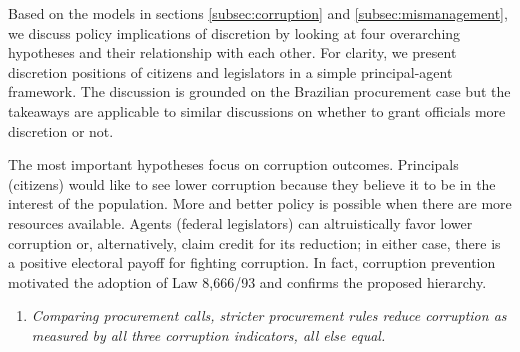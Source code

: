 \documentclass[11pt]{article}
\newcommand{\hypopen}{Comparing procurement calls}
\begin{document}

Based on the models in sections \ref{subsec:corruption} and \ref{subsec:mismanagement}, we discuss policy implications of discretion by looking at four overarching hypotheses and their relationship with each other. For clarity, we present discretion positions of citizens and legislators in a simple principal-agent framework. The discussion is grounded on the Brazilian procurement case but the takeaways are applicable to similar discussions on whether to grant officials more discretion or not.

The most important hypotheses focus on corruption outcomes. Principals (citizens) would like to see lower corruption because they believe it to be in the interest of the population. More and better policy is possible when there are more resources available. Agents (federal legislators) can altruistically favor lower corruption or, alternatively, claim credit for its reduction; in either case, there is a positive electoral payoff for fighting corruption. In fact, corruption prevention motivated the adoption of Law 8,666/93 and confirms the proposed hierarchy.

\begin{enumerate}[label = H\arabic{enumi}:, font = \bfseries, labelindent = \parindent, leftmargin = *, resume] %
  \item \textit{\hypopen, stricter procurement rules reduce corruption as measured by all three corruption indicators, \emph{all else equal}.}
\end{enumerate}
\end{document}
